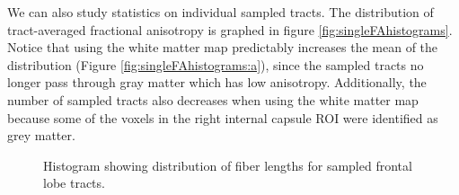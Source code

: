 We can also study statistics on individual sampled tracts.  The distribution of tract-averaged fractional anisotropy is graphed in figure \ref{fig:singleFAhistograms}.  Notice that using the white matter map predictably increases the mean of the distribution (Figure \ref{fig:singleFAhistograms:a}), since the sampled tracts no longer pass through gray matter which has low anisotropy.  Additionally, the number of sampled tracts also decreases when using the white matter map because some of the voxels in the right internal capsule ROI were identified as grey matter.

\begin{figure}
  \label{fig:singelengthhistograms}
	\caption{Histogram showing distribution of fiber lengths for sampled frontal lobe tracts.}
\end{figure}

